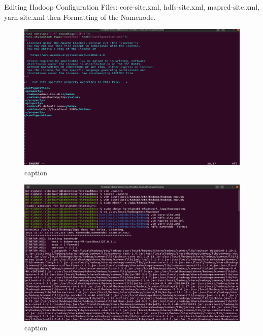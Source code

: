 \begin{spacing}{1.2}
\par Editing Hadoop Configuration Files: core-site.xml, hdfs-site.xml, mapred-site.xml, yarn-site.xml then Formatting of the Namenode. 
\\
\begin{figure}[!htb] 
\begin{center} 
\includegraphics[width=1\linewidth]{Big_Data/Hadoop/Apache Hadoop Installation/core-site.xml config.jpg} 
\end{center} 
\caption{caption} 
\end{figure} 
\FloatBarrier
\begin{figure}[!htb] 
\begin{center} 
\includegraphics[width=1\linewidth]{Big_Data/Hadoop/Apache Hadoop Installation/Hadoop files configuration.jpg} 
\end{center} 
\caption{caption} 
\end{figure} 
\FloatBarrier


\end{spacing}
